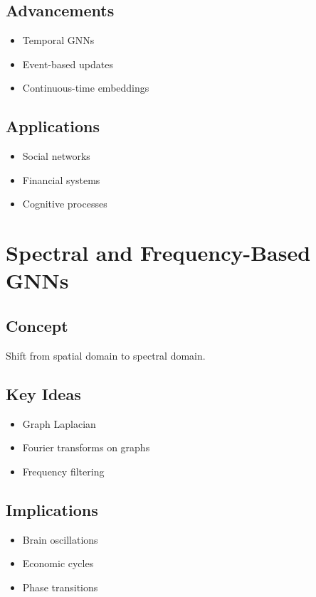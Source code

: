 \subsection{Advancements}
\begin{itemize}
\item Temporal GNNs
\item Event-based updates
\item Continuous-time embeddings
\end{itemize}

\subsection{Applications}
\begin{itemize}
\item Social networks
\item Financial systems
\item Cognitive processes
\end{itemize}

\section{Spectral and Frequency-Based GNNs}

\subsection{Concept}
Shift from spatial domain to spectral domain.

\subsection{Key Ideas}
\begin{itemize}
\item Graph Laplacian
\item Fourier transforms on graphs
\item Frequency filtering
\end{itemize}

\subsection{Implications}
\begin{itemize}
\item Brain oscillations
\item Economic cycles
\item Phase transitions
\end{itemize}

